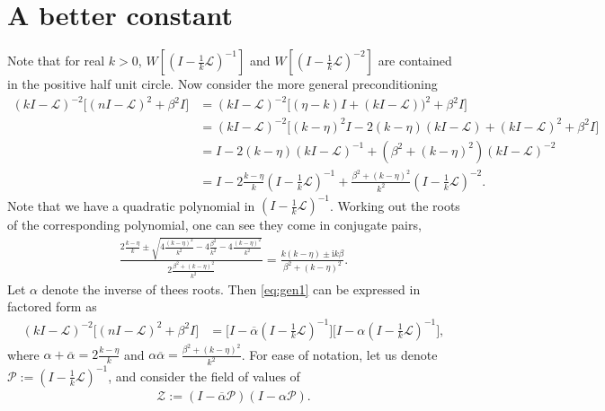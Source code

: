 \documentclass[a4paper,10pt]{article}
\begin{document}
\section{A better constant}

Note that for real $k>0$, $W\left[\left(I - \tfrac{1}{k}\mathcal{L}\right)^{-1}\right]$ and
$W\left[\left(I - \tfrac{1}{k}\mathcal{L}\right)^{-2}\right]$ are contained in
the positive half unit circle. Now consider the more general preconditioning
%
\begin{align}\nonumber
(kI - \mathcal{L})^{-2}\Big[(nI - \mathcal{L})^2 + \beta^2 I\Big] 
	& = (kI - \mathcal{L})^{-2}\Big[(\eta-k)I + (kI - \mathcal{L}))^2 + \beta^2 I\Big] \\
& = (kI - \mathcal{L})^{-2}\Big[(k-\eta)^2I - 2(k-\eta)(kI - \mathcal{L}) + (kI - \mathcal{L})^2 + \beta^2 I\Big] \nonumber\\
& = I - 2(k-\eta)(kI - \mathcal{L})^{-1} + (\beta^2 + (k-\eta)^2)(kI - \mathcal{L})^{-2} \nonumber\\
& = I - 2\frac{k-\eta}{k}\left(I - \tfrac{1}{k}\mathcal{L}\right)^{-1} + \frac{\beta^2 + (k-\eta)^2}{k^2}
	\left(I - \tfrac{1}{k}\mathcal{L}\right)^{-2}.\label{eq:gen1}
\end{align}
%
Note that we have a quadratic polynomial in $\left(I - \tfrac{1}{k}\mathcal{L}\right)^{-1}$.
Working out the roots of the corresponding polynomial, one can see they come in
conjugate pairs,
%
\begin{align*}
\frac{ 2\frac{k-\eta}{k} \pm \sqrt{4\frac{(k-\eta)^2}{k^2} - 4\frac{\beta^2}{k^2} -
	4\frac{(k-\eta)^2}{k^2}}}{ 2\frac{\beta^2 + (k-\eta)^2}{k^2}} 
= \frac{k(k-\eta) \pm \mathrm{i} k\beta}{\beta^2 + (k-\eta)^2}.
\end{align*}
%
Let $\alpha$ denote the inverse of thees roots. Then \eqref{eq:gen1} can
be expressed in factored form as
%
\begin{align*}
(kI - \mathcal{L})^{-2}\Big[(nI - \mathcal{L})^2 + \beta^2 I\Big] 
	& = \Big[I - \overline{\alpha}\left(I - \tfrac{1}{k}\mathcal{L}\right)^{-1}\Big]
	\Big[I - \alpha\left(I - \tfrac{1}{k}\mathcal{L}\right)^{-1}\Big],
\end{align*}
%
where $\alpha + \overline{\alpha} = 2\tfrac{k-\eta}{k}$ and $\alpha\overline{\alpha}
= \tfrac{\beta^2 + (k-\eta)^2}{k^2}$. For ease of notation, let us denote
$\mathcal{P} := \left(I - \tfrac{1}{k}\mathcal{L}\right)^{-1}$,
and consider the field of values of 
%
\begin{align*}
\mathcal{Z} := (I - \overline{\alpha}\mathcal{P})(I - {\alpha}\mathcal{P}).
\end{align*}
%
\end{document}
